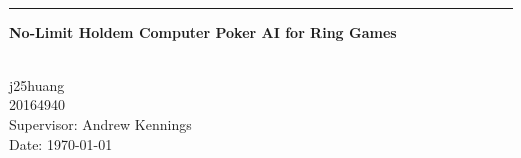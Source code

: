 \begin{titlepage}
\begin{center}


      \huge \textbf{\thetitle}
\\[0.30em]	  {\hrule height0.02em}

\vspace{0.5em}
	\Large \textbf{No-Limit Holdem Computer Poker AI for Ring Games}

    \vfill
    \small
	\textbf{\theauthor}
\\[1.2em]
    
	j25huang
	\\20164940
\\[3em]
	
	Supervisor: Andrew Kennings
    \\Date: \today


\end{center}
\end{titlepage}
\clearpage
